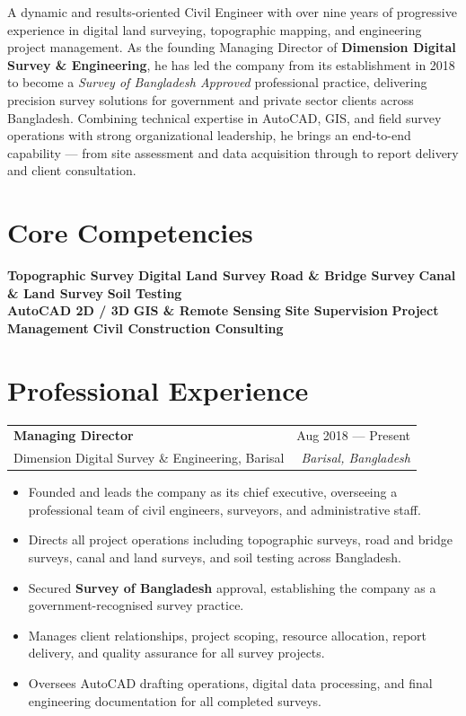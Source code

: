 \documentclass[11pt, a4paper]{article}
\makeatletter
\newcommand{\cvtag}[1]{%
  \colorbox{ddseNavy!10}{\color{ddseNavy}\small\bfseries #1}%
}
\newcommand{\cventry}[4]{%
  \begin{tabularx}{\linewidth}{@{}X r@{}}
    {\bfseries\color{ddseNavy} #1} & {\small\color{ddseMid} #3} \\
    {\color{ddseBlue}\small #2}    & {\small\color{ddseMid}\textit{#4}} \\
  \end{tabularx}%
}
\makeatother
\begin{document}
A dynamic and results-oriented Civil Engineer with over nine years of progressive experience
in digital land surveying, topographic mapping, and engineering project management.
As the founding Managing Director of \textbf{Dimension Digital Survey \& Engineering},
he has led the company from its establishment in 2018 to become a
\textit{Survey of Bangladesh Approved} professional practice, delivering precision
survey solutions for government and private sector clients across Bangladesh.
Combining technical expertise in AutoCAD, GIS, and field survey operations with strong
organizational leadership, he brings an end-to-end capability — from site assessment
and data acquisition through to report delivery and client consultation.

\vspace{4pt}

\section{Core Competencies}

\noindent
\cvtag{Topographic Survey}\quad
\cvtag{Digital Land Survey}\quad
\cvtag{Road \& Bridge Survey}\quad
\cvtag{Canal \& Land Survey}\quad
\cvtag{Soil Testing}\\[6pt]
\cvtag{AutoCAD 2D / 3D}\quad
\cvtag{GIS \& Remote Sensing}\quad
\cvtag{Site Supervision}\quad
\cvtag{Project Management}\quad
\cvtag{Civil Construction Consulting}

\vspace{4pt}

\section{Professional Experience}

\cventry{Managing Director}{Dimension Digital Survey \& Engineering, Barisal}{Aug 2018 — Present}{Barisal, Bangladesh}

\vspace{4pt}
\begin{itemize}[leftmargin=1.4em, itemsep=2pt, topsep=2pt]
  \item Founded and leads the company as its chief executive, overseeing a professional
        team of civil engineers, surveyors, and administrative staff.
  \item Directs all project operations including topographic surveys, road and bridge
        surveys, canal and land surveys, and soil testing across Bangladesh.
  \item Secured \textbf{Survey of Bangladesh} approval, establishing the company as a
        government-recognised survey practice.
  \item Manages client relationships, project scoping, resource allocation, report delivery,
        and quality assurance for all survey projects.
  \item Oversees AutoCAD drafting operations, digital data processing, and final
        engineering documentation for all completed surveys.
\end{itemize}
\end{document}

